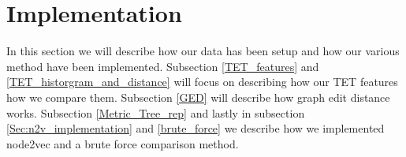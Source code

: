 \section{Implementation}\label{Implementation}
In this section we will describe how our data has been setup and how our various method have been implemented. Subsection \ref{TET_features} and \ref{TET_historgram_and_distance} will focus on describing how our TET features how we compare them. Subsection \ref{GED} will describe how graph edit distance works. Subsection \ref{Metric_Tree_rep} and lastly in subsection \ref{Sec:n2v_implementation} and \ref{brute_force} we describe how we implemented node2vec and a brute force comparison method.







